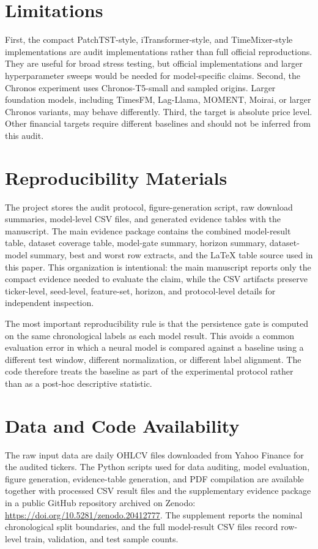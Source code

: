 \documentclass[11pt]{article}
\begin{document}
\section{Limitations}

First, the compact PatchTST-style, iTransformer-style, and TimeMixer-style implementations are audit implementations rather than full official reproductions. They are useful for broad stress testing, but official implementations and larger hyperparameter sweeps would be needed for model-specific claims. Second, the Chronos experiment uses Chronos-T5-small and sampled origins. Larger foundation models, including TimesFM, Lag-Llama, MOMENT, Moirai, or larger Chronos variants, may behave differently. Third, the target is absolute price level. Other financial targets require different baselines and should not be inferred from this audit.

\section{Reproducibility Materials}

The project stores the audit protocol, figure-generation script, raw download summaries, model-level CSV files, and generated evidence tables with the manuscript. The main evidence package contains the combined model-result table, dataset coverage table, model-gate summary, horizon summary, dataset-model summary, best and worst row extracts, and the LaTeX table source used in this paper. This organization is intentional: the main manuscript reports only the compact evidence needed to evaluate the claim, while the CSV artifacts preserve ticker-level, seed-level, feature-set, horizon, and protocol-level details for independent inspection.

The most important reproducibility rule is that the persistence gate is computed on the same chronological labels as each model result. This avoids a common evaluation error in which a neural model is compared against a baseline using a different test window, different normalization, or different label alignment. The code therefore treats the baseline as part of the experimental protocol rather than as a post-hoc descriptive statistic.

\section{Data and Code Availability}

The raw input data are daily OHLCV files downloaded from Yahoo Finance for the audited tickers. The Python scripts used for data auditing, model evaluation, figure generation, evidence-table generation, and PDF compilation are available together with processed CSV result files and the supplementary evidence package in a public GitHub repository archived on Zenodo: \url{https://doi.org/10.5281/zenodo.20412777}. The supplement reports the nominal chronological split boundaries, and the full model-result CSV files record row-level train, validation, and test sample counts.
\end{document}
